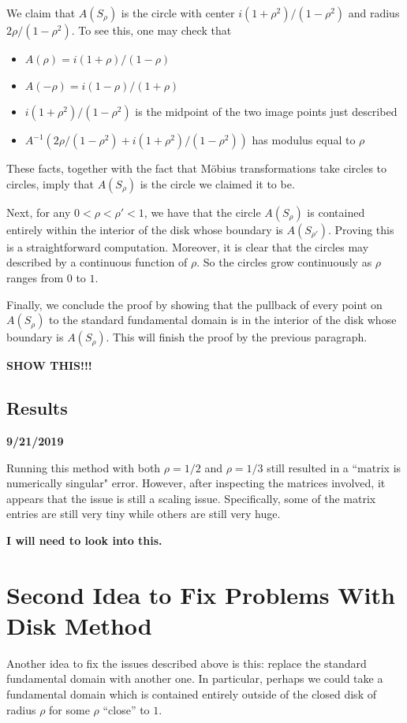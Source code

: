 \documentclass[]{article}
\begin{document}
We claim that $A(S_\rho)$ is the circle with center $i(1+\rho^2)/(1-\rho^2)$ and radius $2\rho/(1-\rho^2)$.
To see this, one may check that
\begin{itemize}
	\item $A(\rho) = i(1+\rho)/(1-\rho)$
	\item $A(-\rho) = i(1-\rho)/(1+\rho)$
	\item $i(1+\rho^2)/(1-\rho^2)$ is the midpoint of the two image points just described
	\item $A^{-1}(2\rho/(1-\rho^2) + i(1+\rho^2)/(1-\rho^2))$ has modulus equal to $\rho$
\end{itemize}
These facts, together with the fact that M\"obius transformations take circles to circles, imply that $A(S_\rho)$ is the circle we claimed it to be.

Next, for any $0 < \rho < \rho' < 1$, we have that the circle $A(S_\rho)$ is contained entirely within the interior of the disk whose boundary is $A(S_{\rho'})$.
Proving this is a straightforward computation.
Moreover, it is clear that the circles may described by a continuous function of $\rho$.
So the circles grow continuously as $\rho$ ranges from $0$ to $1$.

Finally, we conclude the proof by showing that the pullback of every point on $A(S_\rho)$ to the standard fundamental domain is in the interior of the disk whose boundary is $A(S_\rho)$.
This will finish the proof by the previous paragraph.

\textbf{SHOW THIS!!!}

\subsection{Results}

\textbf{9/21/2019}

Running this method with both $\rho = 1/2$ and $\rho = 1/3$ still resulted in a ``matrix is numerically singular" error.
However, after inspecting the matrices involved, it appears that the issue is still a scaling issue.
Specifically, some of the matrix entries are still very tiny while others are still very huge.

\textbf{I will need to look into this.}

\section{Second Idea to Fix Problems With Disk Method}\label{fix2}

Another idea to fix the issues described above is this: replace the standard fundamental domain with another one.
In particular, perhaps we could take a fundamental domain which is contained entirely outside of the closed disk of radius $\rho$ for some $\rho$ ``close'' to $1$.
\end{document}
